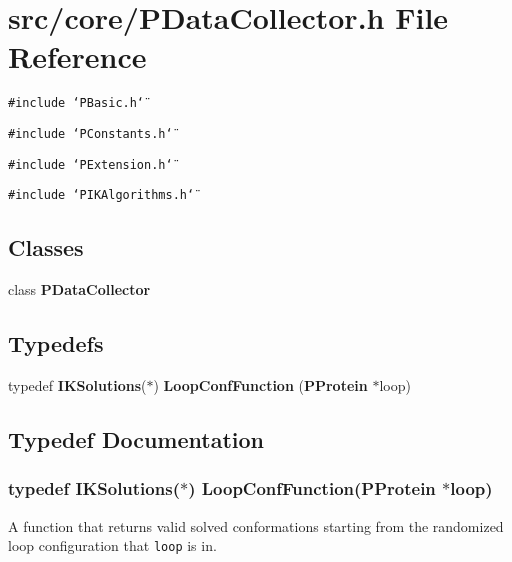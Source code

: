 \section{src/core/PData\-Collector.h File Reference}
\label{PDataCollector_8h}


{\tt \#include \char`\"{}PBasic.h\char`\"{}}\par
{\tt \#include \char`\"{}PConstants.h\char`\"{}}\par
{\tt \#include \char`\"{}PExtension.h\char`\"{}}\par
{\tt \#include \char`\"{}PIKAlgorithms.h\char`\"{}}\par
\subsection*{Classes}
\begin{CompactItemize}
\item 
class {\bf PData\-Collector}
\end{CompactItemize}
\subsection*{Typedefs}
\begin{CompactItemize}
\item 
typedef {\bf IKSolutions}($\ast$) {\bf Loop\-Conf\-Function} ({\bf PProtein} $\ast$loop)
\end{CompactItemize}


\subsection{Typedef Documentation}
\subsubsection{\setlength{\rightskip}{0pt plus 5cm}typedef {\bf IKSolutions}($\ast$) {\bf Loop\-Conf\-Function}({\bf PProtein} $\ast$loop)}\label{PDataCollector_8h_10c131136bc553651544f3b3a6308b6b}


A function that returns valid solved conformations starting from the randomized loop configuration that {\tt loop} is in. 